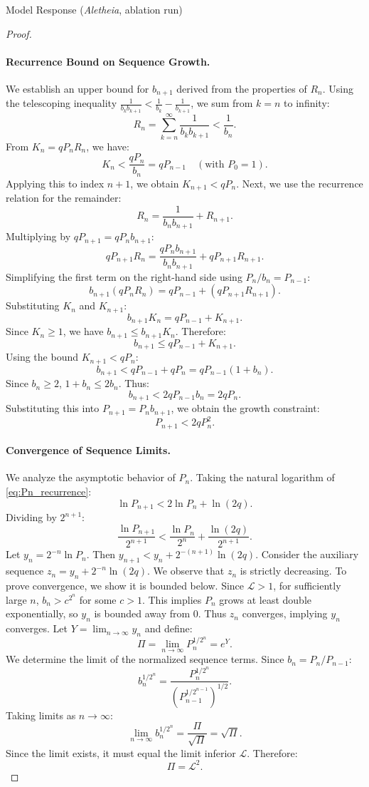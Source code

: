 \documentclass[11pt]{article}
\begin{document}
\begin{solution}{Model Response (\emph{Aletheia}, ablation run)}
\begin{proof}
\paragraph{Recurrence Bound on Sequence Growth.}
We establish an upper bound for $b_{n+1}$ derived from the properties of $R_n$. Using the telescoping inequality $\frac{1}{b_k b_{k+1}} < \frac{1}{b_k} - \frac{1}{b_{k+1}}$, we sum from $k=n$ to infinity:
\[ R_n = \sum_{k=n}^\infty \frac{1}{b_k b_{k+1}} < \frac{1}{b_n}. \]
From $K_n = q P_n R_n$, we have:
\[ K_n < \frac{q P_n}{b_n} = q P_{n-1} \quad (\text{with } P_0=1). \]
Applying this to index $n+1$, we obtain $K_{n+1} < q P_n$. Next, we use the recurrence relation for the remainder:
\[ R_n = \frac{1}{b_n b_{n+1}} + R_{n+1}. \]
Multiplying by $q P_{n+1} = q P_n b_{n+1}$:
\[ q P_{n+1} R_n = \frac{q P_n b_{n+1}}{b_n b_{n+1}} + q P_{n+1} R_{n+1}. \]
Simplifying the first term on the right-hand side using $P_n/b_n = P_{n-1}$:
\[ b_{n+1} (q P_n R_n) = q P_{n-1} + (q P_{n+1} R_{n+1}). \]
Substituting $K_n$ and $K_{n+1}$:
\[ b_{n+1} K_n = q P_{n-1} + K_{n+1}. \]
Since $K_n \ge 1$, we have $b_{n+1} \le b_{n+1} K_n$. Therefore:
\[ b_{n+1} \le q P_{n-1} + K_{n+1}. \]
Using the bound $K_{n+1} < q P_n$:
\[ b_{n+1} < q P_{n-1} + q P_n = q P_{n-1} (1 + b_n). \]
Since $b_n \ge 2$, $1+b_n \le 2 b_n$. Thus:
\[ b_{n+1} < 2 q P_{n-1} b_n = 2 q P_n. \]
Substituting this into $P_{n+1} = P_n b_{n+1}$, we obtain the growth constraint:
\begin{equation} \label{eq:Pn_recurrence}
P_{n+1} < 2 q P_n^2.
\end{equation}

\paragraph{Convergence of Sequence Limits.}
We analyze the asymptotic behavior of $P_n$. Taking the natural logarithm of \eqref{eq:Pn_recurrence}:
\[ \ln P_{n+1} < 2 \ln P_n + \ln(2q). \]
Dividing by $2^{n+1}$:
\[ \frac{\ln P_{n+1}}{2^{n+1}} < \frac{\ln P_n}{2^n} + \frac{\ln(2q)}{2^{n+1}}. \]
Let $y_n = 2^{-n} \ln P_n$. Then $y_{n+1} < y_n + 2^{-(n+1)} \ln(2q)$. Consider the auxiliary sequence $z_n = y_n + 2^{-n} \ln(2q)$. We observe that $z_n$ is strictly decreasing. To prove convergence, we show it is bounded below. Since $\mathcal{L} > 1$, for sufficiently large $n$, $b_n > c^{2^n}$ for some $c > 1$. This implies $P_n$ grows at least double exponentially, so $y_n$ is bounded away from 0. Thus $z_n$ converges, implying $y_n$ converges. Let $Y = \lim_{n\to\infty} y_n$ and define:
\[ \Pi = \lim_{n\to\infty} P_n^{1/2^n} = e^Y. \]
We determine the limit of the normalized sequence terms. Since $b_n = P_n / P_{n-1}$:
\[ b_n^{1/2^n} = \frac{P_n^{1/2^n}}{ (P_{n-1}^{1/2^{n-1}})^{1/2} }. \]
Taking limits as $n \to \infty$:
\[ \lim_{n\to\infty} b_n^{1/2^n} = \frac{\Pi}{\sqrt{\Pi}} = \sqrt{\Pi}. \]
Since the limit exists, it must equal the limit inferior $\mathcal{L}$. Therefore:
\begin{equation} \label{eq:Pi_L2}
\Pi = \mathcal{L}^2.
\end{equation}


\end{proof}
\end{solution}
\end{document}
